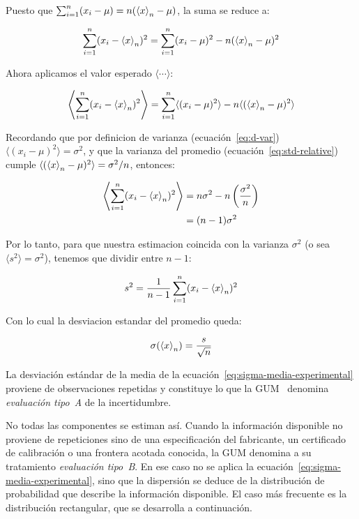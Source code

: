 Puesto que $\sum_{i=1}^n (x_i - \mu) = n(\left\langle x \right\rangle_n - \mu)$, la suma se reduce a:

\begin{equation}
  \sum_{i=1}^n (x_i - \left\langle x \right\rangle_n)^2 = \sum_{i=1}^n (x_i - \mu)^2 -
  n(\left\langle x \right\rangle_n - \mu)^2
  \label{eq:descomposicion-residuos}
\end{equation}

Ahora aplicamos el valor esperado $\langle \cdots \rangle$:

\begin{equation}
  \left\langle \sum_{i=1}^n (x_i - \left\langle x \right\rangle_n)^2 \right\rangle =
  \sum_{i=1}^n \langle (x_i - \mu)^2 \rangle - n \langle (\left\langle x \right\rangle_n -
  \mu)^2 \rangle
  \label{eq:esperanza-residuos}
\end{equation}

Recordando que por definicion de varianza (ecuación~\eqref{eq:d-var})
$\langle (x_i - \mu)^2 \rangle = \sigma^2$, y que la varianza del
promedio (ecuación~\eqref{eq:std-relative}) cumple $\langle (\left\langle x \right\rangle_n
- \mu)^2 \rangle = \sigma^2 / n$, entonces:

\begin{align}
  \left\langle \sum_{i=1}^n (x_i - \left\langle x \right\rangle_n)^2 \right\rangle &=
  n\sigma^2 - n\left(\frac{\sigma^2}{n}\right) \nonumber \\
  &= (n - 1)\sigma^2
  \label{eq:esperanza-bessel}
\end{align}

Por lo tanto, para que nuestra estimacion coincida con la varianza
$\sigma^2$ (o sea $\langle s^2 \rangle = \sigma^2$), tenemos que
dividir entre $n - 1$:

\begin{equation}
  s^2 = \frac{1}{n - 1} \sum_{i=1}^n (x_i - \left\langle x \right\rangle_n)^2
  \label{eq:varianza-muestral-insesgada}
\end{equation}

Con lo cual la desviacion estandar del promedio queda:

\begin{equation}
  \sigma(\left\langle x \right\rangle_n) = \frac{s}{\sqrt{n}}
  \label{eq:sigma-media-experimental}
\end{equation}

La desviación estándar de la media de la
ecuación~\eqref{eq:sigma-media-experimental} proviene de observaciones
repetidas y constituye lo que la GUM~\parencite{jcgm2008gum} denomina
\textit{evaluación tipo~A} de la incertidumbre.

No todas las componentes se estiman así. Cuando la información disponible
no proviene de repeticiones sino de una especificación del fabricante, un
certificado de calibración o una frontera acotada conocida, la GUM
denomina a su tratamiento \textit{evaluación tipo~B}. En ese caso no se
aplica la ecuación~\eqref{eq:sigma-media-experimental}, sino que la
dispersión se deduce de la distribución de probabilidad que describe la
información disponible. El caso más frecuente es la distribución
rectangular, que se desarrolla a continuación.
